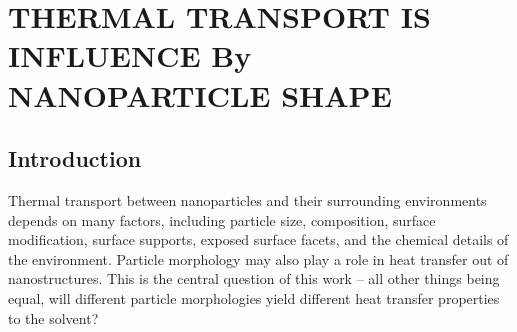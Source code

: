 \chapter{THERMAL TRANSPORT IS INFLUENCE By NANOPARTICLE SHAPE}\label{chap:morph}


\section{Introduction}
Thermal transport between nanoparticles and their surrounding
environments depends on many factors, including particle
size,\cite{Zanjani2014,Liu2015,Wilhelmsen2015,Stocker2016,Tascini2016}
composition,\cite{Wilson:2002uq, Ge:2004yg,Ong:2013rt} surface
modification,\cite{Ge:2004yg,kuang:AuThl,Ong:2013rt,Ong:2014yq,Liu2015,Stocker2016,Hannah2015,Park2016,Meng:2017,Leitner2017}
surface supports,\cite{Schmidt:2010,Park2012} exposed surface
facets,\cite{Norris:2013,Hannah2015,Han:2017} and the chemical details
of the
environment.\cite{Ge2006,Schmidt:2010,Park2012,Ong:2013rt,Ong:2014yq,Wilhelmsen2015,Giri:2016,Park2016,Bhanushali:2017,Yadav:2017}
Particle morphology may also play a role in heat transfer out of
nanostructures.  This is the central question of this work -- all
other things being equal, will different particle morphologies yield
different heat transfer properties to the solvent?

